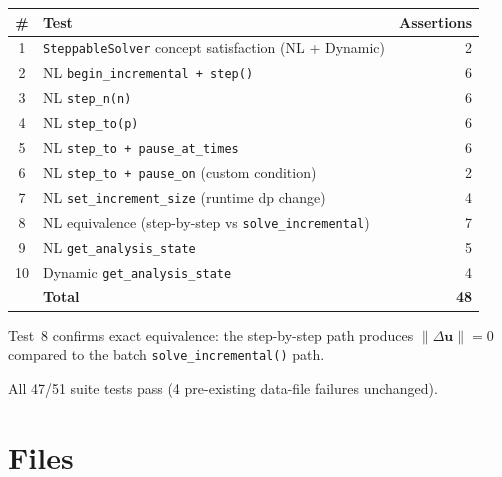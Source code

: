 \begin{center}
\begin{tabular}{clr}
\hline
\textbf{\#} & \textbf{Test} & \textbf{Assertions} \\
\hline
1  & \texttt{SteppableSolver} concept satisfaction (NL + Dynamic)  & 2  \\
2  & NL \texttt{begin\_incremental + step()}                       & 6  \\
3  & NL \texttt{step\_n(n)}                                        & 6  \\
4  & NL \texttt{step\_to(p)}                                       & 6  \\
5  & NL \texttt{step\_to + pause\_at\_times}                       & 6  \\
6  & NL \texttt{step\_to + pause\_on} (custom condition)           & 2  \\
7  & NL \texttt{set\_increment\_size} (runtime dp change)          & 4  \\
8  & NL equivalence (step-by-step vs \texttt{solve\_incremental})  & 7  \\
9  & NL \texttt{get\_analysis\_state}                              & 5  \\
10 & Dynamic \texttt{get\_analysis\_state}                         & 4  \\
\hline
   & \textbf{Total}                                                & \textbf{48} \\
\hline
\end{tabular}
\end{center}

Test~8 confirms exact equivalence: the step-by-step path produces
$\|\Delta\mathbf{u}\| = 0$ compared to the batch
\texttt{solve\_incremental()} path.

All 47/51 suite tests pass (4 pre-existing data-file failures unchanged).


\section{Files}

